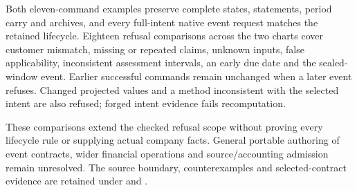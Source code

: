 Both eleven-command examples preserve complete states, statements, period
carry and archives, and every full-intent native event request matches the
retained lifecycle. Eighteen refusal comparisons across the two charts cover
customer mismatch, missing or repeated claims, unknown inputs, false
applicability, inconsistent assessment intervals, an early due date and the
sealed-window event. Earlier successful commands remain unchanged when a later
event refuses. Changed projected values and a method inconsistent with the
selected intent are also refused; forged intent evidence fails recomputation.

These comparisons extend the checked refusal scope without proving every
lifecycle rule or supplying actual company facts. General portable authoring
of event contracts, wider financial operations and source/accounting admission
remain unresolved. The source boundary, counterexamples and selected-contract
evidence are retained under
 and
.

\par
